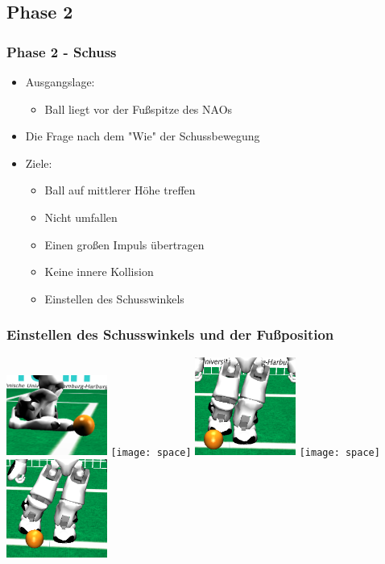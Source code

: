 \documentclass[]{beamer}
\begin{document}
\subsection{Phase 2}
\begin{frame}
	\frametitle{Phase 2 - Schuss}
	\begin{itemize}
		\item Ausgangslage:
		\begin{itemize}
			\item Ball liegt vor der Fußspitze des NAOs
		\end{itemize} 		 
		\item Die Frage nach dem "Wie" der Schussbewegung
		\item Ziele:
		\begin{itemize}
			\item Ball auf mittlerer Höhe treffen
			\item Nicht umfallen
			\item Einen großen Impuls übertragen
			\item Keine innere Kollision
			\item Einstellen des Schusswinkels
		\end{itemize}		 		 
	\end{itemize}
\end{frame}

\begin{frame}
	\frametitle{Einstellen des Schusswinkels und der Fußposition}
	\begin{center}
	\includegraphics[width=3.3cm]{shootside}
	\texttt{[image: space]}
	\includegraphics[width=3.3cm]{shootfrontinner}
	\texttt{[image: space]}
	\includegraphics[width=3.3cm]{shhotfrontouter}
	\end{center}
\end{frame}
\end{document}
